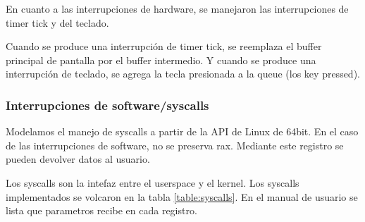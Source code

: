 \documentclass{article}
\begin{document}
En cuanto a las interrupciones de hardware, se manejaron las interrupciones de timer tick y del teclado.

Cuando se produce una interrupción de timer tick, se reemplaza el buffer principal de pantalla por el buffer intermedio. Y cuando se produce una interrupción de teclado, se agrega la tecla presionada a la queue (los key pressed).

\subsubsection {Interrupciones de software/syscalls}

Modelamos el manejo de syscalls a partir de la API de Linux de 64bit. En el caso de las interrupciones de software, no se preserva rax. Mediante este registro se pueden devolver datos al usuario.

Los syscalls son la intefaz entre el userspace y el kernel. Los syscalls implementados se volcaron en la tabla \ref{table:syscalls}. En el manual de usuario se lista que parametros recibe en cada registro.
\end{document}

